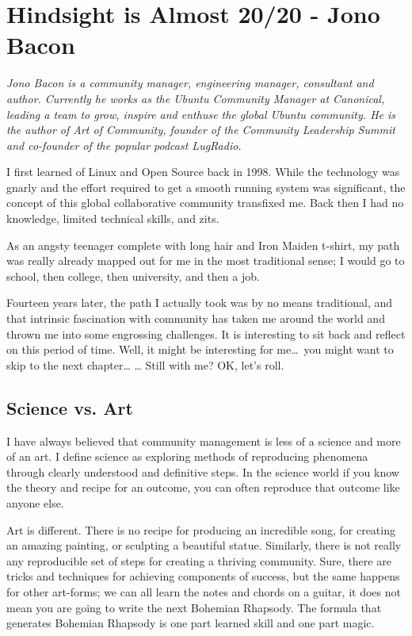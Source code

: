 \chapter{Hindsight is Almost 20/20 - Jono Bacon}

\textit{Jono Bacon is a community manager, engineering manager, consultant and author.
Currently he works as the Ubuntu Community Manager at Canonical, leading a team
to grow, inspire and enthuse the global Ubuntu community. He is the author of
Art of Community, founder of the Community Leadership Summit and co-founder of
the popular podcast LugRadio.}

I first learned of Linux and Open Source back in 1998. While the technology was
gnarly and the effort required to get a smooth running system was significant,
the concept of this global collaborative community transfixed me. Back then I
had no knowledge, limited technical skills, and zits.

As an angsty teenager complete with long hair and Iron Maiden t-shirt, my path
was really already mapped out for me in the most traditional sense; I would go
to school, then college, then university, and then a job.

Fourteen years later, the path I actually took was by no means traditional, and
that intrinsic fascination with community has taken me around the world and
thrown me into some engrossing challenges. It is interesting to sit back and
reflect on this period of time. Well, it might be interesting for me\dots\ you
might want to skip to the next chapter\dots 
\newline
\dots
\newline
Still with me? OK, let’s roll.

\section*{Science vs. Art}

I have always believed that community management is less of a science and more
of an art. I define science as exploring methods of reproducing phenomena
through clearly understood and definitive steps. In the science world if you
know the theory and recipe for an outcome, you can often reproduce that outcome
like anyone else.

Art is different. There is no recipe for producing an incredible song, for
creating an amazing painting, or sculpting a beautiful statue. Similarly, there
is not really any reproducible set of steps for creating a thriving community.
Sure, there are tricks and techniques for achieving components of success, but
the same happens for other art-forms; we can all learn the notes and chords on a
guitar, it does not mean you are going to write the next Bohemian Rhapsody. The
formula that generates Bohemian Rhapsody is one part learned skill and one part
magic.

